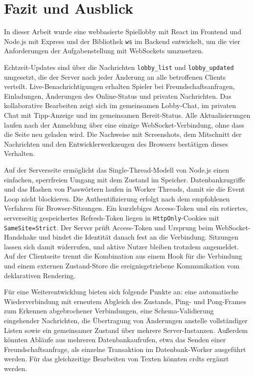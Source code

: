 \chapter{Fazit und Ausblick}
\label{kap:fazit}
\verfasser{\autorSE}

In dieser Arbeit wurde eine webbasierte Spiellobby mit React im Frontend und Node.js mit Express und der Bibliothek \texttt{ws} im Backend entwickelt, um die vier Anforderungen der Aufgabenstellung mit WebSockets umzusetzen.

Echtzeit-Updates sind über die Nachrichten \texttt{lobby\_list} und \texttt{lobby\_updated} umgesetzt, die der Server nach jeder Änderung an alle betroffenen Clients verteilt. Live-Benachrichtigungen erhalten Spieler bei Freundschaftsanfragen, Einladungen, Änderungen des Online-Status und privaten Nachrichten. Das kollaborative Bearbeiten zeigt sich im gemeinsamen Lobby-Chat, im privaten Chat mit Tipp-Anzeige und im gemeinsamen Bereit-Status. Alle Aktualisierungen laufen nach der Anmeldung über eine einzige WebSocket-Verbindung, ohne dass die Seite neu geladen wird. Die Nachweise mit Screenshots, dem Mitschnitt der Nachrichten und den Entwicklerwerkzeugen des Browsers bestätigen dieses Verhalten.

Auf der Serverseite ermöglicht das Single-Thread-Modell von Node.js einen einfachen, sperrfreien Umgang mit dem Zustand im Speicher. Datenbankzugriffe und das Hashen von Passwörtern laufen in Worker Threads, damit sie die Event Loop nicht blockieren. Die Authentifizierung erfolgt nach dem empfohlenen Verfahren für Browser-Sitzungen. Ein kurzlebiges Access-Token und ein rotiertes, serverseitig gespeichertes Refresh-Token liegen in \texttt{HttpOnly}-Cookies mit \texttt{SameSite=Strict}. Der Server prüft Access-Token und Ursprung beim WebSocket-Handshake und bindet die Identität danach fest an die Verbindung. Sitzungen lassen sich damit widerrufen, und aktive Nutzer bleiben trotzdem angemeldet. Auf der Clientseite trennt die Kombination aus einem Hook für die Verbindung und einem externen Zustand-Store die ereignisgetriebene Kommunikation vom deklarativen Rendering.

Für eine Weiterentwicklung bieten sich folgende Punkte an: eine automatische Wiederverbindung mit erneutem Abgleich des Zustands, Ping- und Pong-Frames zum Erkennen abgebrochener Verbindungen, eine Schema-Validierung eingehender Nachrichten, die Übertragung von Änderungen anstelle vollständiger Listen sowie ein gemeinsamer Zustand über mehrere Server-Instanzen. Außerdem könnten Abläufe aus mehreren Datenbankaufrufen, etwa das Senden einer Freundschaftsanfrage, als einzelne Transaktion im Datenbank-Worker ausgeführt werden. Für das gleichzeitige Bearbeiten von Texten könnten \glspl{crdt} ergänzt werden.
